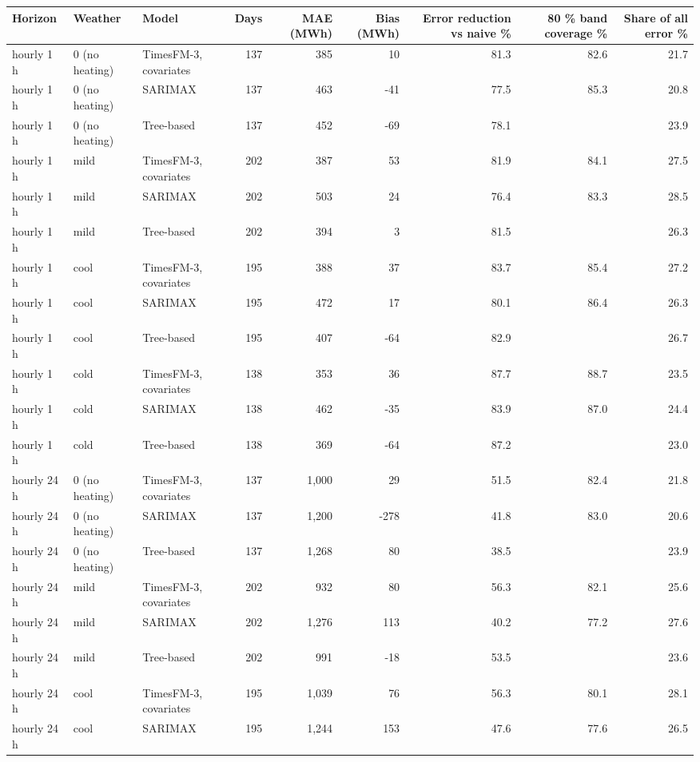 \begin{tabular}{lllrrrrrr}
\toprule
Horizon & Weather & Model & Days & MAE (MWh) & Bias (MWh) & Error reduction vs naive \% & 80 \% band coverage \% & Share of all error \% \\
\midrule
hourly 1 h & 0 (no heating) & TimesFM-3, covariates & 137 & 385 & 10 & 81.3 & 82.6 & 21.7 \\
hourly 1 h & 0 (no heating) & SARIMAX & 137 & 463 & -41 & 77.5 & 85.3 & 20.8 \\
hourly 1 h & 0 (no heating) & Tree-based & 137 & 452 & -69 & 78.1 &  & 23.9 \\
hourly 1 h & mild & TimesFM-3, covariates & 202 & 387 & 53 & 81.9 & 84.1 & 27.5 \\
hourly 1 h & mild & SARIMAX & 202 & 503 & 24 & 76.4 & 83.3 & 28.5 \\
hourly 1 h & mild & Tree-based & 202 & 394 & 3 & 81.5 &  & 26.3 \\
hourly 1 h & cool & TimesFM-3, covariates & 195 & 388 & 37 & 83.7 & 85.4 & 27.2 \\
hourly 1 h & cool & SARIMAX & 195 & 472 & 17 & 80.1 & 86.4 & 26.3 \\
hourly 1 h & cool & Tree-based & 195 & 407 & -64 & 82.9 &  & 26.7 \\
hourly 1 h & cold & TimesFM-3, covariates & 138 & 353 & 36 & 87.7 & 88.7 & 23.5 \\
hourly 1 h & cold & SARIMAX & 138 & 462 & -35 & 83.9 & 87.0 & 24.4 \\
hourly 1 h & cold & Tree-based & 138 & 369 & -64 & 87.2 &  & 23.0 \\
hourly 24 h & 0 (no heating) & TimesFM-3, covariates & 137 & 1,000 & 29 & 51.5 & 82.4 & 21.8 \\
hourly 24 h & 0 (no heating) & SARIMAX & 137 & 1,200 & -278 & 41.8 & 83.0 & 20.6 \\
hourly 24 h & 0 (no heating) & Tree-based & 137 & 1,268 & 80 & 38.5 &  & 23.9 \\
hourly 24 h & mild & TimesFM-3, covariates & 202 & 932 & 80 & 56.3 & 82.1 & 25.6 \\
hourly 24 h & mild & SARIMAX & 202 & 1,276 & 113 & 40.2 & 77.2 & 27.6 \\
hourly 24 h & mild & Tree-based & 202 & 991 & -18 & 53.5 &  & 23.6 \\
hourly 24 h & cool & TimesFM-3, covariates & 195 & 1,039 & 76 & 56.3 & 80.1 & 28.1 \\
hourly 24 h & cool & SARIMAX & 195 & 1,244 & 153 & 47.6 & 77.6 & 26.5 \\

\end{tabular}
